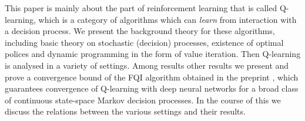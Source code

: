
This paper is mainly about the part of reinforcement learning that is called
Q-learning, which is a category of algorithms which can \emph{learn} from
interaction with a decision process.
We present the background theory for these algorithms,
including basic theory on stochastic (decision) processes,
existence of optimal polices and
dynamic programming in the form of value iteration.
Then Q-learning is analysed in a variety of settings.
Among results other results we present and prove a convergence bound of the
FQI algorithm obtained in the preprint ,
which guarantees convergence of Q-learning with deep neural networks
for a broad class of continuous state-space Markov decision processes.
In the course of this we discuss the relations between the various settings
and their results.
